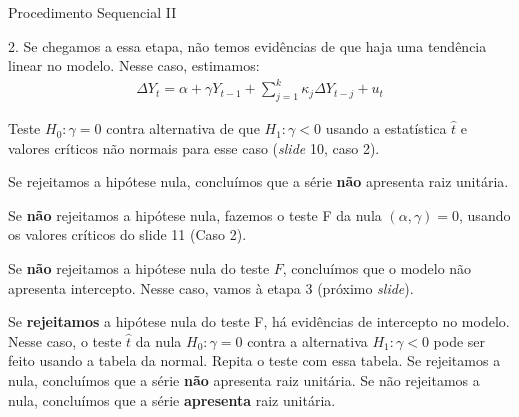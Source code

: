 \documentclass[11pt]{beamer}
\newenvironment{halfwideenumerate}{\enumerate\addtolength{\itemsep}{0.5em}}{\endenumerate}
\begin{document}
\begin{frame}{Procedimento Sequencial II}

		
		{ 2.} Se chegamos a essa etapa, não temos evidências de que haja uma tendência linear no modelo. Nesse caso, estimamos:
		\begin{equation*}
			\begin{aligned}
				\Delta Y_t = \alpha  + \gamma Y_{t-1}  +\sum_{j=1}^k \kappa_j \Delta Y_{t-j} + u_t
			\end{aligned}
		\end{equation*}
		
		Teste $H_0: \gamma = 0$ contra alternativa de que $H_1: \gamma < 0$ usando a estatística $\hat{t}$ e valores críticos não normais para esse caso (\textit{slide} 10, caso 2).
		\begin{halfwideenumerate}
			\small 
			\item[2.1] Se rejeitamos a hipótese nula, concluímos que a série \textbf{não} apresenta raiz unitária.
			\item[2.2] Se \textbf{não} rejeitamos a hipótese nula, fazemos o teste F da nula $(\alpha, \gamma)=0$, usando os valores críticos do slide 11 (Caso 2).
			\begin{halfwideenumerate}
				\footnotesize
				\item[2.2.1] Se \textbf{não} rejeitamos a hipótese  nula do teste $F$, concluímos que o modelo não apresenta intercepto. Nesse caso, vamos à etapa 3 (próximo \textit{slide}).
				\item[2.2.2] Se \textbf{rejeitamos} a hipótese nula do teste F, há evidências de intercepto no modelo. Nesse caso, o teste $\hat{t}$ da nula $H_0: \gamma = 0$ contra a alternativa  $H_1: \gamma < 0$ pode ser feito usando a tabela da normal. Repita o teste com essa tabela. Se rejeitamos a nula, concluímos que a série \textbf{não} apresenta raiz unitária. Se não rejeitamos a nula, concluímos que a série \textbf{apresenta} raiz unitária.
			\end{halfwideenumerate}
		\end{halfwideenumerate}
		

	
\end{frame}
\end{document}
